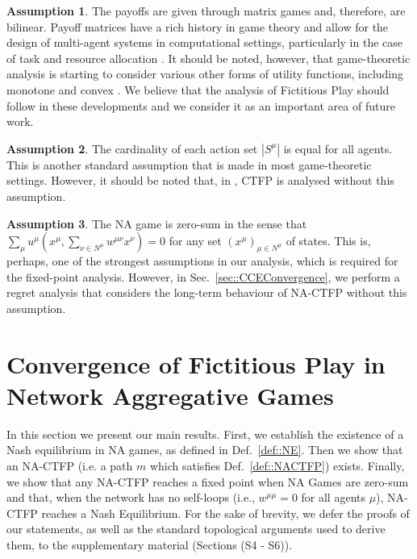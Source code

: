\documentclass{article}
\theoremstyle{definition}
\newtheorem{assumption}{Assumption}
\newcommand{\actionset}[1]{S^{#1}}
\newcommand{\wmunu}{w^{\mu \nu}}
\newcommand{\xmu}{x^{\mu}}
\newcommand{\xnu}{x^{\nu}}
\newcommand{\weightedsum}{ \sum_{\nu \in N^\mu} \wmunu \xnu}
\begin{document}
  \begin{assumption}\label{ass::matrixgame}
    The payoffs are given through matrix games and, therefore, are
    bilinear. Payoff matrices have a rich history in game theory and
    allow for the design of multi-agent systems in computational
    settings, particularly in the case of task and resource allocation
    \cite{Nisan2007}. It should be noted, however, that game-theoretic
    analysis is starting to consider various other forms of utility
    functions, including monotone and convex \cite{Parise2020}. We
    believe that the analysis of Fictitious Play should follow in
    these developments and we consider it as an important area of
    future work.
  \end{assumption}

  \begin{assumption}\label{ass::sameactions}
    The cardinality of each action set $|\actionset{\mu}|$ is equal
    for all agents. This is another standard assumption that is made in
    most game-theoretic settings. However, it should be noted that, in \cite{Ewerhart2020},
    CTFP is analysed without this assumption.
  \end{assumption}

  \begin{assumption}\label{ass::zerosum}
    The NA game is zero-sum in the sense that $\sum_{\mu} u^\mu(\xmu,
    \weightedsum) = 0$ for any set $(x^\mu)_{\mu \in N^\mu}$ of
    states. This is, perhaps, one of the strongest assumptions in our
    analysis, which is required for the fixed-point analysis. However,
    in Sec.~\ref{sec::CCEConvergence}, we perform a regret analysis
    that considers the long-term behaviour of NA-CTFP without this
    assumption.
  \end{assumption}

\section{Convergence of Fictitious Play in Network Aggregative Games}
\label{sec::CTFPAnalysis}

  
  In this section we present our main results. First, we establish the
  existence of a Nash equilibrium in NA games, as defined in
  Def.~\ref{def::NE}. Then we show that an NA-CTFP (i.e. a path $m$ which satisfies Def.~\ref{def::NACTFP}) exists. Finally, we show that any NA-CTFP reaches a fixed point when
  NA Games are zero-sum and that, when the network has no self-loops
  (i.e., $w^{\mu \mu} = 0$ for all agents $\mu$), NA-CTFP reaches a Nash Equilibrium. For the sake
  of brevity, we defer the proofs of our statements, as well as the
  standard topological arguments used to derive them, to the
  supplementary material (Sections (S4 - S6)).
\end{document}
